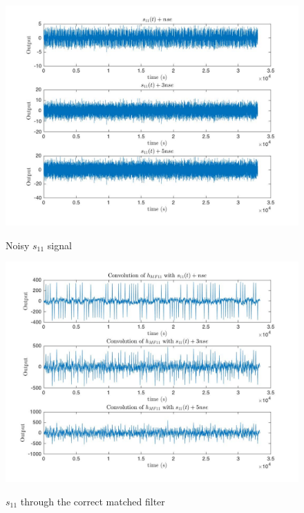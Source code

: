 \documentclass{article}
\begin{document}
\begin{figure}[!htb]
    \centering
    \begin{minipage}{.5\textwidth}
        \centering
        \includegraphics[width=1.0\linewidth, height=0.2\textheight]{s11noise.jpg}

        \label{fig:prob1_6_2}
    \end{minipage}
    \caption{Noisy $s_{11}$ signal}
\end{figure}

\begin{figure}[!htb]
    \centering
    \begin{minipage}{.5\textwidth}
        \centering
        \includegraphics[width=1.0\linewidth, height=0.2\textheight]{s11h11.jpg}

        \label{fig:prob1_6_2}
    \end{minipage}
    \caption{$s_{11}$ through the correct matched filter}
\end{figure}
\end{document}
